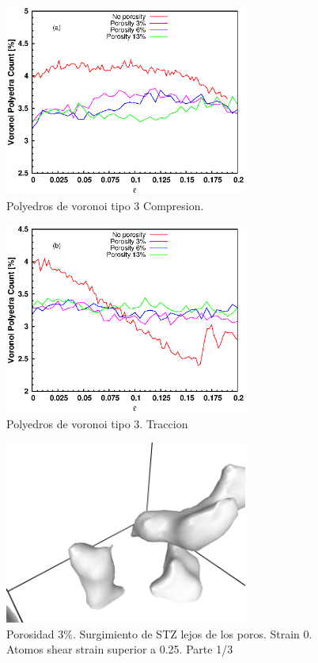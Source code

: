 \documentclass[10pt, oneside]{article} %
\begin{document}

\begin{figure}[H]
\centering
\includegraphics[width=8cm]{Figures/porosity_tipe3_strain_comp.eps}
\caption{Polyedros de voronoi tipo 3 Compresion.}
\end{figure}

\begin{figure}[H]
\centering
\includegraphics[width=8cm]{Figures/porosity_tipe3_strain_tens.eps}
\caption{Polyedros de voronoi tipo 3. Traccion}
\end{figure}

\begin{figure}[H]
\centering
\includegraphics[width=8cm]{Figures/porosidad_STZObservation_3_0.png}
\caption{Porosidad 3\%. Surgimiento de STZ lejos de los poros. Strain 0. Atomos shear strain superior a 0.25. Parte 1/3}
\end{figure}
\end{document}
